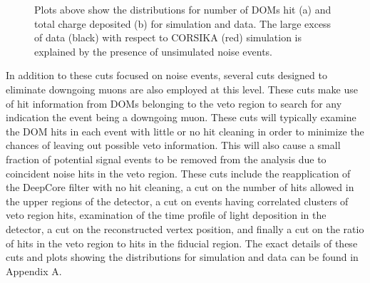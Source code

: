\documentclass{gatech-thesis}
\begin{document}
\begin{figure}
\centering
{}
\caption[L3 MicroHits and MicroCharge Distributions]{Plots above show the distributions for number of DOMs hit (a) and total charge deposited (b) for simulation and data. The large excess of data (black) with respect to CORSIKA (red) simulation is explained by the presence of unsimulated noise events.} 
\label{fig:MicroHitAndCharge}
\end{figure}

In addition to these cuts focused on noise events, several cuts designed to eliminate downgoing muons are also employed at this level. These cuts make use of hit information from DOMs belonging to the veto region to search for any indication the event being a downgoing muon. These cuts will typically examine the DOM hits in each event with little or no hit cleaning in order to minimize the chances of leaving out possible veto information. This will also cause a small fraction of potential signal events to be removed from the analysis due to coincident noise hits in the veto region. These cuts include the reapplication of the DeepCore filter with no hit cleaning, a cut on the number of hits allowed in the upper regions of the detector, a cut on events having correlated clusters of veto region hits, examination of the time profile of light deposition in the detector, a cut on the reconstructed vertex position, and finally a cut on the ratio of hits in the veto region to hits in the fiducial region. The exact details of these cuts and plots showing the distributions for simulation and data can be found in Appendix A.
\end{document}
